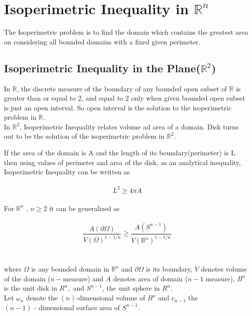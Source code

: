 \documentclass[oneside]{book}
\begin{document}
	
	
	
	
	
	
	
	
	
	
	
	
	
	
	
	
	
	
	
	
	\chapter{Isoperimetric Inequality in $\mathbb{R}^{n}$} 
	\label{chap:c3}
	The Isoperimetric problem is to find the domain which contains the greatest area on considering all bounded domains with a fixed given perimeter.
	
	
	
	
	
	\section{\textbf{Isoperimetric Inequality in the Plane($\mathbb{R}^{2}$)}}
	\label{s:2}
	In $\mathbb{R}$, the discrete measure of the boundary of any bounded open subset of $\mathbb{R}$ is greater than or equal to 2, and equal to 2 only when given bounded open subset is just an open interval. So open interval is the solution to the isoperimetric problem in $\mathbb{R}$.\\
	In $\mathbb{R}^{2}$, Isoperimetric Inequality relates volume ad area of a domain. Disk turns out to be the solution of the isoperimetric problem in $\mathbb{R}^{2}.$   
	
	If the area of the domain is A and the length of its boundary(perimeter) is L then using values of perimeter and area of the disk,
	as an analytical inequality, Isoperimetric Inequality can be written as \\\\
	\begin{equation}
	\label{eq5}  
	L^{2} \geq 4 \pi A
	\end{equation}
	\\
	For $\mathbb{R}^{n}$ 
	, $n \geq 2$  it can be generalized as
	\\\\
	\begin{equation}
	\label{eq6}  
	\frac{A(\partial \Omega)}{V(\Omega)^{1-1 / n}} \geq \frac{A\left(S^{n-1}\right)}{V\left(\mathbb{B}^{n}\right)^{1-1 / n}}
	\end{equation} \\\\
	where $\Omega$ is any bounded domain in $\mathbb{R}^{n}$ and $\partial \Omega$ is its boundary, $V$ denotes volume of the domain ($n-$measure) and $A$ denotes area of domain ($n-1$ measure), $B^{n}$ is the unit disk in $R^{n},$ and $S^{n-1}$,
	the unit sphere in $R^{n}$.
	\\
	Let $\omega_{n}$ denote the $(n)$-dimensional volume of $B^{n}$ and  $c_{n-1}$ the \\ $(n-1)$ -
	dimensional surface area of $S^{n-1}$. \\
	
\end{document}
